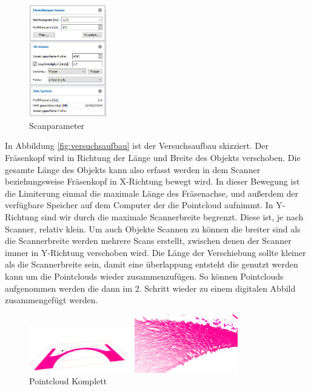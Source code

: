 \documentclass[../main.tex]{subfiles}
\begin{document}
\begin{figure}
    \includegraphics[width=0.3\textwidth]{images/Parameter_Scan.png}
    \caption{Scanparameter}
    \label{fig:scanparameter}
\end{figure}

In Abbildung \ref*{fig:versuchsaufbau} ist der Versuchsaufbau skizziert.
Der Fräsenkopf wird in Richtung der Länge und Breite des Objekts verschoben.
Die gesamte Länge des Objekts kann also erfasst werden in dem Scanner 
beziehungsweise Fräsenkopf in X-Richtung bewegt wird. In dieser Bewegung 
ist die Limiterung einmal die maximale Länge des Fräsenachse, und außerdem der
verfügbare Speicher auf dem Computer der die Pointcloud aufnimmt.
In Y-Richtung sind wir durch die maximale Scannerbreite begrenzt. Diese ist, 
je nach Scanner, relativ klein.
Um auch Objekte Scannen zu können die breiter sind als die Scannerbreite werden
mehrere Scans erstellt, zwischen denen der Scanner immer in Y-Richtung 
verschoben wird. Die Länge der Verschiebung sollte kleiner als die 
Scannerbreite sein, damit eine überlappung entsteht die genutzt werden kann 
um die Pointclouds wieder zusammenzufügen. So können Pointclouds aufgenommen 
werden die dann im 2. Schritt wieder zu einem digitalen Abbild zusammengefügt 
werden.

\begin{figure}
    \begin{center}
        \includegraphics[width=0.4\textwidth]{images/pointcloud_big.PNG}
        \smallskip\par
        \includegraphics[width=0.4\textwidth]{images/pointcloud_small.PNG}
    \end{center}
    \caption{Pointcloud Komplett}
    \label{fig:pointclouds}
\end{figure}
\end{document}
